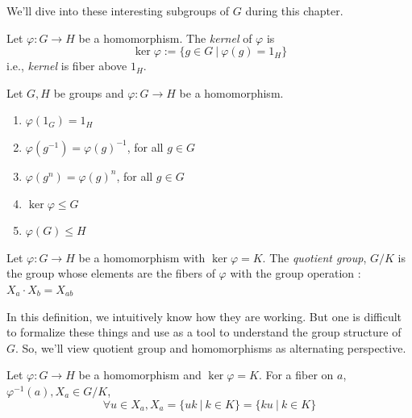 \documentclass[12pt, a4paper, openany, twoside]{book}
\theoremstyle{definition}
\theoremstyle{remark}
\theoremstyle{plain}
\numberwithin{equation}{section}
\begin{document}
We'll dive into these interesting subgroups of $G$ during this chapter. 

\begin{tcolorbox}[colback=yellow!10!white,colframe=brown!75!black,title=Kernel]

Let $\varphi : G \rightarrow H$ be a homomorphism. The \textit{kernel} of $\varphi$ is 
\[\ker \varphi := \{g \in G ~|~ \varphi(g) = 1_H\}\]
i.e., \textit{kernel} is fiber above $1_H$. 
\end{tcolorbox}

\begin{tcolorbox}[colback=yellow!10!white,colframe=green!75!black,title=Proposition 1]

Let $G, H$ be groups and $\varphi : G \rightarrow H$ be a homomorphism. 

\begin{enumerate}
    \item $\varphi(1_G) = 1_H$
    \item $\varphi(g^{-1}) = \varphi(g)^{-1}$, for all $g \in G$
    \item $\varphi(g^n) = \varphi(g)^n$, for all $g \in G$
    \item $\ker \varphi \leq G$ 
    \item $\varphi(G) \leq H$
\end{enumerate}

\end{tcolorbox}

\begin{tcolorbox}[colback=yellow!10!white,colframe=brown!75!black,title=Quotient Groups]

Let $\varphi : G \rightarrow H$ be a homomorphism with $\ker \varphi = K$. The \textit{quotient group}, $G / K$ is the group 
whose elements are the fibers of $\varphi$ with the group operation : $X_a \cdot X_b = X_{ab}$

\end{tcolorbox}

In this definition, we intuitively know how they are working. But one is difficult to formalize these things and 
use as a tool to understand the group structure of $G$. So, we'll view quotient group and homomorphisms as alternating perspective. 

\begin{tcolorbox}[colback=yellow!10!white,colframe=green!75!black,title=Proposition 2]

Let $\varphi: G \rightarrow H$ be a homomorphism and $\ker \varphi = K$. For a fiber on $a$, $\varphi^{-1}(a), X_a \in G / K$, 
\[\forall u \in X_a, X_a = \{uk ~|~ k \in K\} = \{ku ~|~ k \in K\}\]

\end{tcolorbox}
\end{document}
